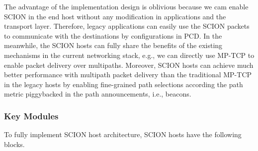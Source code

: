 The advantage of the implementation design is oblivious because we
cam enable SCION in the end host without any modification in
applications and the transport layer. Therefore, legacy applications
can easily use the SCION packets to communicate with the
destinations by configurations in PCD. In the meanwhile, the SCION
hosts can fully share the benefits of the existing mechanisms in the
current networking stack, e.g., we can directly use MP-TCP to enable
packet delivery over multipaths. Moreover, SCION hosts can achieve
much better performance with multipath packet delivery than the
traditional MP-TCP in the legacy hosts by enabling fine-grained path
selections according the path metric piggybacked in the path
announcements, i.e., beacons.

\subsubsection{Key Modules}

To fully implement SCION host architecture, SCION hosts have the
following blocks.

